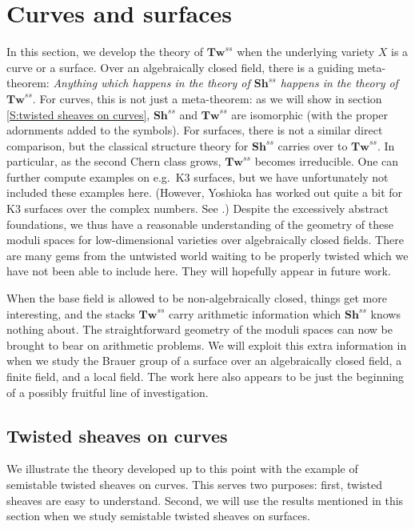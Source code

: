 \documentclass[11pt]{amsart}
\renewcommand{\[}{[\!\hspace{0.03em}[}
\renewcommand{\]}{]\!\hspace{0.03em}]}
\renewcommand{\(}{(\!\hspace{0.03em}(}
\renewcommand{\)}{)\!\hspace{0.03em})}
\newcommand{\Tw}{\mathbf{Tw}}
\newcommand{\Sh}{\mathbf{Sh}}
\theoremstyle{definition}
\theoremstyle{remark}
\begin{document}
\section{Curves and surfaces}\label{S:curves and surfaces}
In this section, we develop the theory of $\Tw^{ss}$ when the 
underlying variety $X$ is a curve or a surface.  Over an algebraically 
closed field, there is a guiding meta-theorem: \emph{Anything which happens 
in the theory of $\Sh^{ss}$ happens in the theory of $\Tw^{ss}$\/}.  
For curves, this is not just a meta-theorem: as we will show in 
section \ref{S:twisted sheaves on curves}, $\Sh^{ss}$ and $\Tw^{ss}$ 
are isomorphic (with the proper adornments added to the symbols).  For surfaces, there is not 
a similar direct comparison, but the classical structure theory for 
$\Sh^{ss}$ carries over to $\Tw^{ss}$.  In particular, as the second Chern 
class grows, $\Tw^{ss}$ becomes irreducible.  One can further compute 
examples on e.g.\ K3 surfaces, but we have unfortunately not included these examples 
here.  (However, Yoshioka has worked out quite a bit for K3 surfaces over the complex numbers.  See \cite{yoshioka3}.)  Despite the excessively abstract 
foundations, we thus have a reasonable understanding of the geometry of 
these moduli spaces for low-dimensional varieties over algebraically 
closed fields.  There are many gems from the untwisted world waiting to 
be properly twisted which we have not been able to include here.  
They will hopefully appear in future work.

When the base field is allowed to be non-algebraically closed, things get more 
interesting, and the stacks $\Tw^{ss}$ carry arithmetic information 
which $\Sh^{ss}$ knows nothing about.  The straightforward geometry of the moduli spaces can 
now be brought to bear on arithmetic problems.  We will exploit this extra 
information in \cite{period-index-paper} when we study the Brauer group 
of a surface over an algebraically closed field, a 
finite field, and a local field.  The work here also appears to be just 
the beginning of a possibly fruitful line of investigation.

\subsection{Twisted sheaves on curves}\label{S:twisted sheaves on 
curves}
We illustrate the theory developed up to this point with the example 
of semistable twisted sheaves on curves.  This serves two purposes: 
first, twisted sheaves are easy to understand.  Second, we will 
use the results mentioned in this section when we study semistable 
twisted sheaves on surfaces.
\end{document}

